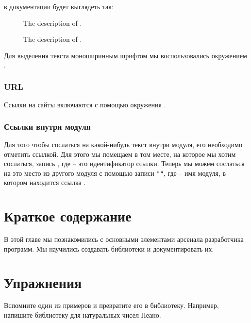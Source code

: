 \noindent 

в документации будет выглядеть так:

\begin{description}
\item[]
The description of .
\item[]
The description of .
\end{description}

\smallskip

Для выделения текста моноширинным шрифтом мы воспользовались окружением
.

\subsubsection{URL}

Ссылки на сайты включаются с помощью окружения .

\subsubsection{Ссылки внутри модуля}

Для того чтобы сослаться на какой-нибудь текст внутри модуля, его
необходимо отметить ссылкой. Для этого мы помещаем в том месте, на
которое мы хотим сослаться, запись , где  -- это
идентификатор ссылки. Теперь мы можем сослаться на это место из другого
модуля с помощью записи \In{}\verb!"!\verb!"!\In{}, где
 -- имя модуля, в котором находится ссылка .

\section{Краткое содержание}

В этой главе мы познакомились с основными элементами арсенала
разработчика программ. Мы научились создавать библиотеки и
документировать их.

\section{Упражнения}

Вспомните один из примеров и превратите его в библиотеку. Например,
напишите библиотеку для натуральных чисел Пеано.

